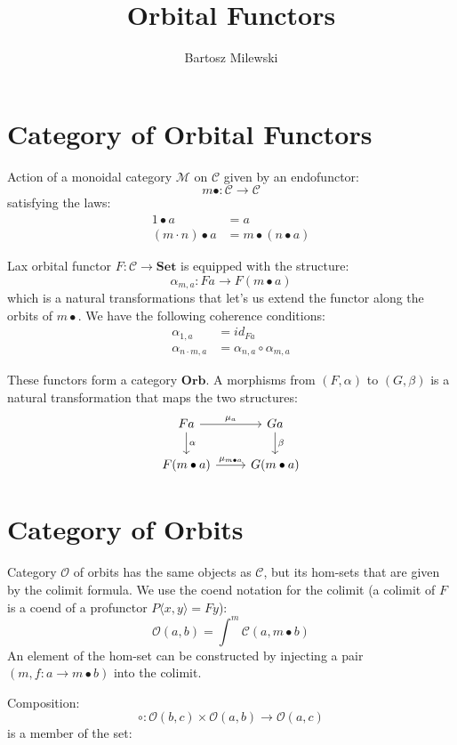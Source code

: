 \documentclass[11pt]{amsart}
\author{Bartosz Milewski}
\title{Orbital Functors}
\newcommand{\cat}[1]{\mathcal{#1}}%
\newcommand{\Cat}[1]{\mathbf{#1}}%
\newcommand{\Set}{\Cat{Set}}
\begin{document}
\maketitle{}

\section{Category of Orbital Functors}

Action of a monoidal category $\cat M$ on $\cat C$ given by an endofunctor:
\[ m \bullet \colon \cat C \to \cat C \]
satisfying the laws:
\begin{align*}
1 \bullet a &= a \\
(m \cdot n) \bullet a &= m \bullet (n \bullet a)
\end{align*}

Lax orbital functor $F \colon \cat C \to \Set$ is equipped with the structure:
\[ \alpha_{m, a} \colon F a \to F (m \bullet a) \]
which is a natural transformations that let's us extend the functor along the orbits of $m \bullet$. We have the following coherence conditions:
\begin{align*}
\alpha_{1, a} &= id_{F a} \\
\alpha_{n \cdot m, a} &= \alpha_{n, a} \circ \alpha_{m, a}
\end{align*}

These functors form a category $\mathbf{Orb}$.  A morphisms from $(F, \alpha)$ to $(G, \beta)$ is a natural transformation that maps the two structures:
\[
\begin{tikzcd}
F a
\arrow[r, "\mu_a"]
\arrow[d, "\alpha"]
& G a
\arrow[d, "\beta"]
\\ F (m \bullet a) 
\arrow[r, "\mu_{m \bullet a}"]
& G (m \bullet a)
\end{tikzcd}
\]

\section{Category of Orbits}

Category $\cat O$ of orbits has the same objects as $\cat C$, but its hom-sets that are given by the colimit formula. We use the coend notation for the colimit (a colimit of $F$ is a coend of a profunctor $P\langle x, y \rangle = F y$):
\[ \cat O(a, b) = \int^m \cat C(a, m \bullet b) \]
An element of the hom-set can be constructed by injecting a pair $(m, f \colon a \to m \bullet b)$ into the colimit.

Composition: 
\[ \circ \colon \cat O(b, c) \times \cat O(a, b) \to \cat O(a, c) \]
is a member of the set:
\end{document}
